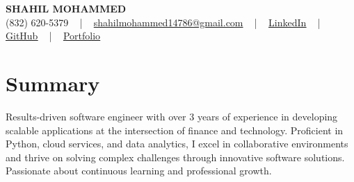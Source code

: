 \documentclass[letterpaper,10pt]{article}
\begin{document}
\begin{center}
    {\fontsize{14pt}{12pt}\selectfont \textbf{\MakeUppercase{Shahil Mohammed}}}\\ \vspace{2pt}
    \fontsize{10pt}{12pt}\selectfont (832) 620-5379 ~ | ~ \href{mailto:shahilmohammed14786@gmail.com}{shahilmohammed14786@gmail.com} ~ | ~  
    \href{https://www.linkedin.com/in/shahil-mohammed-9652931a1/}{\color{blue}\underline{LinkedIn}}  ~ | ~ 
    \href{https://github.com/freakbeast14}{\color{blue}\underline{GitHub}} ~ | ~ 
    \href{https://shahil-mohammed.netlify.app/}{\color{blue}\underline{Portfolio}}
    \vspace{-8pt}
\end{center}

\section{Summary}
\vspace{-2pt}\fontsize{8pt}{9pt}\selectfont
Results-driven software engineer with over 3 years of experience in developing scalable applications at the intersection of finance and technology. Proficient in Python, cloud services, and data analytics, I excel in collaborative environments and thrive on solving complex challenges through innovative software solutions. Passionate about continuous learning and professional growth.

\vspace{-5pt}
 
\vspace{-2pt}
\end{document}
